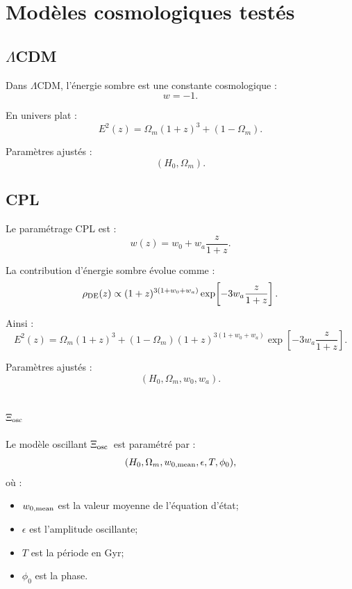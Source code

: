 \documentclass[11pt]{article}
\newcommand{\LCDM}{$\Lambda$CDM}
\newcommand{\Om}{\Omega_m}
\newcommand{\Xiosc}{$\Xi_{\rm osc}$}
\begin{document}
\section{Modèles cosmologiques testés}

\subsection{\texorpdfstring{$\Lambda$CDM}{LambdaCDM}}

Dans \LCDM, l'énergie sombre est une constante cosmologique :
\[
    w=-1.
\]

En univers plat :
\begin{equation}
    E^2(z)=\Om(1+z)^3+(1-\Om).
\end{equation}

Paramètres ajustés :
\[
    (H_0,\Omega_m).
\]

\subsection{CPL}

Le paramétrage CPL est :
\begin{equation}
    w(z)=w_0+w_a\frac{z}{1+z}.
\end{equation}

La contribution d'énergie sombre évolue comme :
\begin{equation}
    \rho_{\rm DE}(z)\propto(1+z)^{3(1+w_0+w_a)}\exp\!\left[-3w_a\frac{z}{1+z}\right].
\end{equation}

Ainsi :
\begin{equation}
    E^2(z)=\Om(1+z)^3+(1-\Om)(1+z)^{3(1+w_0+w_a)}\exp\!\left[-3w_a\frac{z}{1+z}\right].
\end{equation}

Paramètres ajustés :
\[
    (H_0,\Omega_m,w_0,w_a).
\]

\subsection{\texorpdfstring{$\Xi_{\rm osc}$}{Xi osc}}

Le modèle oscillant \Xiosc\ est paramétré par :
\[
    (H_0,\Omega_m,w_{0,{\rm mean}},\epsilon,T,\phi_0),
\]
où :
\begin{itemize}
    \item $w_{0,{\rm mean}}$ est la valeur moyenne de l'équation d'état;
    \item $\epsilon$ est l'amplitude oscillante;
    \item $T$ est la période en Gyr;
    \item $\phi_0$ est la phase.
\end{itemize}
\end{document}
